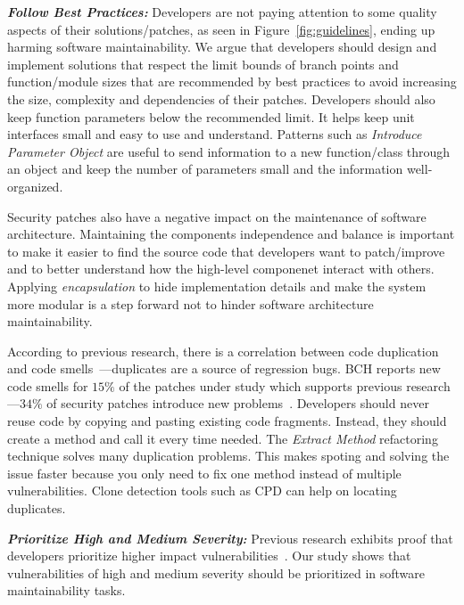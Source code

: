 \documentclass[smallextended]{svjour3}       %
\begin{document}
\textit{\textbf{Follow Best Practices:}} Developers are not 
paying attention to some quality aspects of their solutions/patches, 
as seen in Figure~\ref{fig:guidelines}, ending up harming 
software maintainability. We argue that developers
should design and implement solutions that respect the 
limit bounds of branch points and function/module sizes that are 
recommended by best practices to avoid increasing the 
size, complexity and dependencies of their patches.
Developers should also keep function parameters below 
the recommended limit. It helps keep unit interfaces small 
and easy to use and understand.
Patterns such as \emph{Introduce Parameter Object} are useful 
to send information to a new function/class through an object
and keep the number of parameters small and the information well-organized.

Security patches also have a negative impact on the maintenance of 
software architecture. Maintaining the components independence and balance 
is important to make it easier to find the source code that 
developers want to patch/improve and to better understand
how the high-level componenet interact with others. Applying 
\emph{encapsulation} to hide implementation details and make the system 
more modular is a step forward not to hinder software architecture maintainability.

According to previous research, there is a correlation between 
code duplication and code smells~\cite{7476787}---duplicates are a source 
of regression bugs. BCH reports new code smells
for $15\%$ of the patches under study which supports previous research---$34\%$ of security patches 
introduce new problems~\cite{8819456,10.1145/3133956.3134072}. 
Developers should never reuse code by copying and pasting 
existing code fragments. Instead, they should create a method and call 
it every time needed. The \emph{Extract Method} refactoring 
technique solves many duplication problems. This makes spoting and 
solving the issue faster because you only need to fix one method instead
of multiple vulnerabilities. Clone detection tools such as CPD can help 
on locating duplicates.

\textit{\textbf{Prioritize High and Medium Severity:}} Previous research 
exhibits proof that developers prioritize
higher impact vulnerabilities~\cite{10.1145/3133956.3134072}.
Our study shows that vulnerabilities of high and
medium severity should be prioritized in software maintainability tasks.
\end{document}
